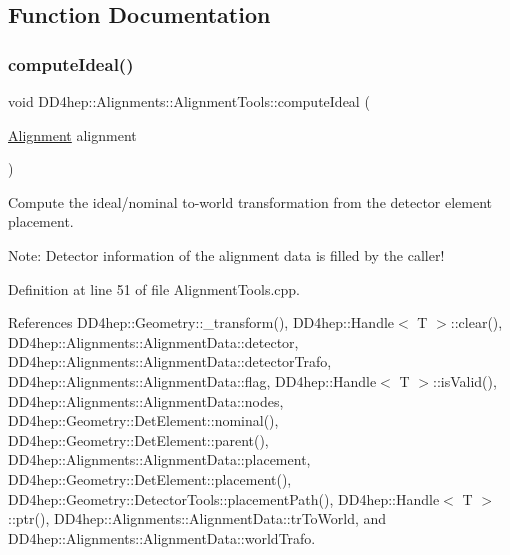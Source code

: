 \subsection{Function Documentation}
\hypertarget{namespace_d_d4hep_1_1_alignments_1_1_alignment_tools_a009dd48155bddca23afba151e2887124}{}\label{namespace_d_d4hep_1_1_alignments_1_1_alignment_tools_a009dd48155bddca23afba151e2887124} 
\subsubsection{\texorpdfstring{compute\+Ideal()}{computeIdeal()}\hspace{0.1cm}{\footnotesize\ttfamily [1/2]}}
{\footnotesize\ttfamily void D\+D4hep\+::\+Alignments\+::\+Alignment\+Tools\+::compute\+Ideal (\begin{DoxyParamCaption}\item[{\hyperlink{class_d_d4hep_1_1_alignments_1_1_alignment}{Alignment}}]{alignment }\end{DoxyParamCaption})}



Compute the ideal/nominal to-\/world transformation from the detector element placement. 

Note\+: Detector information of the alignment data is filled by the caller! 

Definition at line 51 of file Alignment\+Tools.\+cpp.



References D\+D4hep\+::\+Geometry\+::\+\_\+transform(), D\+D4hep\+::\+Handle$<$ T $>$\+::clear(), D\+D4hep\+::\+Alignments\+::\+Alignment\+Data\+::detector, D\+D4hep\+::\+Alignments\+::\+Alignment\+Data\+::detector\+Trafo, D\+D4hep\+::\+Alignments\+::\+Alignment\+Data\+::flag, D\+D4hep\+::\+Handle$<$ T $>$\+::is\+Valid(), D\+D4hep\+::\+Alignments\+::\+Alignment\+Data\+::nodes, D\+D4hep\+::\+Geometry\+::\+Det\+Element\+::nominal(), D\+D4hep\+::\+Geometry\+::\+Det\+Element\+::parent(), D\+D4hep\+::\+Alignments\+::\+Alignment\+Data\+::placement, D\+D4hep\+::\+Geometry\+::\+Det\+Element\+::placement(), D\+D4hep\+::\+Geometry\+::\+Detector\+Tools\+::placement\+Path(), D\+D4hep\+::\+Handle$<$ T $>$\+::ptr(), D\+D4hep\+::\+Alignments\+::\+Alignment\+Data\+::tr\+To\+World, and D\+D4hep\+::\+Alignments\+::\+Alignment\+Data\+::world\+Trafo.



